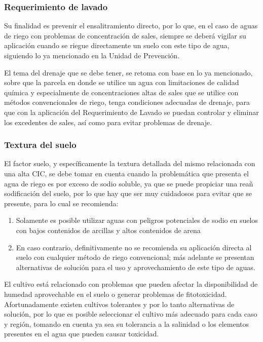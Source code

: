 \subsubsection{Requerimiento de lavado} 
Su finalidad es prevenir el ensalitramiento directo, por lo que, en el caso de aguas de riego con problemas de concentración de sales, siempre se deberá vigilar su aplicación cuando se riegue directamente un suelo con este tipo de agua, siguiendo lo ya mencionado en la Unidad de Prevención.

El tema del drenaje que se debe tener, se retoma con base en lo ya mencionado, sobre que la parcela en donde se utilice un agua con limitaciones de calidad química y especialmente de concentraciones altas de sales que se utilice con métodos convencionales de riego, tenga condiciones adecuadas de drenaje, para que con la aplicación del Requerimiento de Lavado se puedan controlar y eliminar los excedentes de sales, así como para evitar problemas de drenaje.

\subsubsection{Textura del suelo} 
El factor suelo, y específicamente la textura detallada del mismo relacionada con
una alta CIC, se debe tomar en cuenta cuando la problemática que presenta el agua
de riego es por exceso de sodio soluble, ya que se puede propiciar una reañ
sodificación del suelo, por lo que hay que ser muy cuidadosos para evitar que se
presente, para lo cual se recomienda:
\begin{enumerate}
    \item Solamente es posible utilizar aguas con peligros potenciales de sodio en suelos con bajos contenidos de arcillas y altos contenidos de arena
    \item En caso contrario, definitivamente no se recomienda su aplicación directa al suelo con cualquier método de riego convencional; más adelante se presentan alternativas de solución para el uso y aprovechamiento de este tipo de aguas.
\end{enumerate}

El cultivo está relacionado con problemas que pueden afectar la disponibilidad de humedad aprovechable en el suelo o generar problemas de fitotoxicidad. Afortunadamente existen cultivos tolerantes y por lo tanto alternativas de solución, por lo que es posible seleccionar el cultivo más adecuado para cada caso y región, tomando en cuenta ya sea su tolerancia a la salinidad o los elementos presentes en el agua que pueden causar toxicidad.

